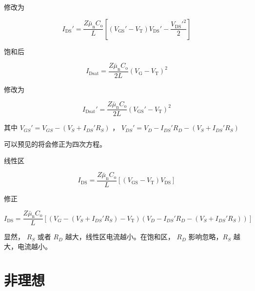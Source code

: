 \documentclass[lang=cn,11pt,a4paper,cite=authoryear]{elegantpaper}
\begin{document}
修改为

\[I_{\mathrm{DS}}'=\frac{Z \bar{\mu}_{\mathrm{n}} C_{\mathrm{o}}}{L}\left[\left(V_{\mathrm{GS}}'-V_{\mathrm{T}}\right) V_{\mathrm{DS}}'-\frac{V_{\mathrm{DS}}'^{2}}{2}\right]\]


饱和后

\[I_{\mathrm{Dsat}}=\frac{Z \bar{\mu}_{\mathrm{n}} C_{\mathrm{o}}}{2 L}\left(V_{\mathrm{G}}-V_{\mathrm{T}}\right)^{2}\]

修改为

\[I_{\mathrm{Dsat}}'=\frac{Z \bar{\mu}_{\mathrm{n}} C_{\mathrm{o}}}{2 L}\left(V_{\mathrm{GS}}'-V_{\mathrm{T}}\right)^{2}\]

其中 \(V_{GS}' = V_{GS} - (V_S + I_{DS}' R_S)\) ， \(V_{DS}' = V_D - I_{DS}' R_D  - (V_S + I_{DS}' R_S)\)

可以预见的将会修正为四次方程。


线性区


\[I_{\mathrm{DS}}=\frac{Z \bar{\mu}_{\mathrm{n}} C_{\mathrm{o}}}{L}\left[\left(V_{\mathrm{GS}}-V_{\mathrm{T}}\right) V_{\mathrm{DS}}\right]\]

修正 

\[I_{\mathrm{DS}}=\frac{Z \bar{\mu}_{\mathrm{n}} C_{\mathrm{o}}}{L}\left[\left(V_{G} - (V_S + I_{DS}' R_S)-V_{\mathrm{T}}\right)(  V_D - I_{DS}' R_D  - (V_S + I_{DS}' R_S))\right]\]

显然， \(R_S\) 或者 \(R_D\) 越大，线性区电流越小。在饱和区， \(R_D \) 影响忽略，\(R_S\) 越大，电流越小。

\part{非理想}








\end{document}
